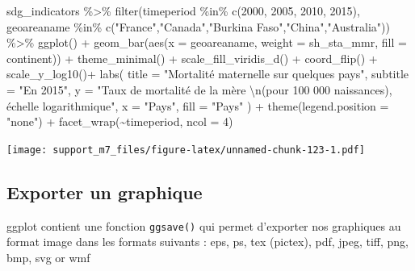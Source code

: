 \documentclass[
]{book}
\newenvironment{Shaded}{\begin{snugshade}}{\end{snugshade}}
\newcommand{\AttributeTok}[1]{\textcolor[rgb]{0.77,0.63,0.00}{#1}}
\newcommand{\DecValTok}[1]{\textcolor[rgb]{0.00,0.00,0.81}{#1}}
\newcommand{\FunctionTok}[1]{\textcolor[rgb]{0.00,0.00,0.00}{#1}}
\newcommand{\NormalTok}[1]{#1}
\newcommand{\SpecialCharTok}[1]{\textcolor[rgb]{0.00,0.00,0.00}{#1}}
\newcommand{\StringTok}[1]{\textcolor[rgb]{0.31,0.60,0.02}{#1}}
\begin{document}
\begin{Shaded}
\begin{Highlighting}[]
\NormalTok{sdg\_indicators }\SpecialCharTok{\%\textgreater{}\%} 
  \FunctionTok{filter}\NormalTok{(timeperiod  }\SpecialCharTok{\%in\%} \FunctionTok{c}\NormalTok{(}\DecValTok{2000}\NormalTok{, }\DecValTok{2005}\NormalTok{, }\DecValTok{2010}\NormalTok{, }\DecValTok{2015}\NormalTok{),}
\NormalTok{         geoareaname }\SpecialCharTok{\%in\%} \FunctionTok{c}\NormalTok{(}\StringTok{"France"}\NormalTok{,}\StringTok{"Canada"}\NormalTok{,}\StringTok{"Burkina Faso"}\NormalTok{,}\StringTok{"China"}\NormalTok{,}\StringTok{"Australia"}\NormalTok{)) }\SpecialCharTok{\%\textgreater{}\%}
  \FunctionTok{ggplot}\NormalTok{() }\SpecialCharTok{+}
  \FunctionTok{geom\_bar}\NormalTok{(}\FunctionTok{aes}\NormalTok{(}\AttributeTok{x =}\NormalTok{ geoareaname, }\AttributeTok{weight =}\NormalTok{ sh\_sta\_mmr, }\AttributeTok{fill =}\NormalTok{ continent)) }\SpecialCharTok{+}
  \FunctionTok{theme\_minimal}\NormalTok{() }\SpecialCharTok{+}
  \FunctionTok{scale\_fill\_viridis\_d}\NormalTok{() }\SpecialCharTok{+}
  \FunctionTok{coord\_flip}\NormalTok{() }\SpecialCharTok{+}
  \FunctionTok{scale\_y\_log10}\NormalTok{()}\SpecialCharTok{+}
  \FunctionTok{labs}\NormalTok{(}
    \AttributeTok{title =} \StringTok{"Mortalité maternelle sur quelques pays"}\NormalTok{,}
    \AttributeTok{subtitle =} \StringTok{"En 2015"}\NormalTok{,}
    \AttributeTok{y =} \StringTok{"Taux de mortalité de la mère }\SpecialCharTok{\textbackslash{}n}\StringTok{(pour 100 000 naissances), échelle logarithmique"}\NormalTok{,}
    \AttributeTok{x =} \StringTok{"Pays"}\NormalTok{,}
    \AttributeTok{fill =} \StringTok{"Pays"}
\NormalTok{  ) }\SpecialCharTok{+}
  \FunctionTok{theme}\NormalTok{(}\AttributeTok{legend.position =} \StringTok{"none"}\NormalTok{) }\SpecialCharTok{+}
  \FunctionTok{facet\_wrap}\NormalTok{(}\SpecialCharTok{\textasciitilde{}}\NormalTok{timeperiod, }\AttributeTok{ncol =} \DecValTok{4}\NormalTok{)}
\end{Highlighting}
\end{Shaded}

\texttt{[image: support\_m7\_files/figure-latex/unnamed-chunk-123-1.pdf]}

\hypertarget{exporter-un-graphique}{%
\subsection{Exporter un graphique}\label{exporter-un-graphique}}

ggplot contient une fonction \texttt{ggsave()} qui permet d'exporter nos graphiques au format image dans les formats suivants : eps, ps, tex (pictex), pdf, jpeg, tiff, png, bmp, svg or wmf
\end{document}
